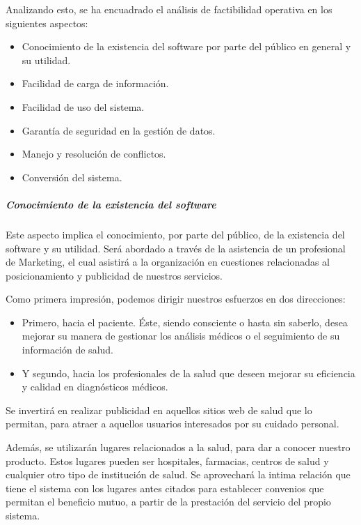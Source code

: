 Analizando esto, se ha encuadrado el análisis de factibilidad operativa en los siguientes aspectos:

\begin{itemize}
    \item Conocimiento de la existencia del software por parte del público en general y su utilidad.
    \item Facilidad de carga de información.
    \item Facilidad de uso del sistema.
    \item Garantía de seguridad en la gestión de datos.
    \item Manejo y resolución de conflictos.
    \item Conversión del sistema.
\end{itemize}


\subparagraph{Conocimiento de la existencia del software}
\label{conocimiento_del_software}
    
	Este aspecto implica el conocimiento, por parte del público, de la existencia del software y su utilidad.
    Será abordado a través de la asistencia de un profesional de Marketing, el cual asistirá a la organización en cuestiones relacionadas al posicionamiento y publicidad de nuestros servicios.
    
    Como primera impresión, podemos dirigir nuestros esfuerzos en dos direcciones:
    
    \begin{itemize}
        \item Primero, hacia el paciente.
        Éste, siendo consciente o hasta sin saberlo, desea mejorar su manera de gestionar los análisis médicos o el seguimiento de su información de salud.
        \item Y segundo, hacia los profesionales de la salud que deseen mejorar su eficiencia y calidad en diagnósticos médicos.
    \end{itemize}
    
    Se invertirá en realizar publicidad en aquellos sitios web de salud que lo permitan, para atraer a aquellos usuarios interesados por su cuidado personal.
    
    Además, se utilizarán lugares relacionados a la salud, para dar a conocer nuestro producto.
    Estos lugares pueden ser hospitales, farmacias, centros de salud y cualquier otro tipo de institución de salud.
    Se aprovechará la intima relación que tiene el sistema con los lugares antes citados para establecer convenios que permitan el beneficio mutuo, a partir de la prestación del servicio del propio sistema. 
    
